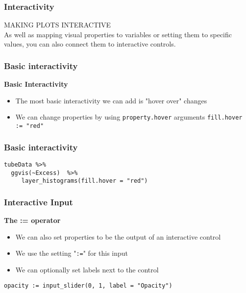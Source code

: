 \documentclass[MASTER.tex]{subfiles}
\begin{document}
 
	
\begin{frame}[fragile]
\frametitle{Interactivity}
{\LARGE MAKING PLOTS INTERACTIVE} \\ \bigskip
\large As well as mapping visual properties to variables or setting them to specific values, you can also connect them to interactive controls.

\end{frame}
\begin{frame}
\frametitle{Basic interactivity}
\large
\textbf{Basic Interactivity}
\begin{itemize}
\item The most basic interactivity we can add is "hover
over" changes
\item We can change properties by using
\texttt{property.hover} arguments
\texttt{fill.hover := "red"}
\end{itemize}
\end{frame}
\begin{frame}[fragile]
	\frametitle{Basic interactivity}
\begin{framed}
\begin{verbatim}
tubeData %>%
  ggvis(~Excess)  %>%
     layer_histograms(fill.hover = "red") 
\end{verbatim}
\end{framed}
\end{frame}
\begin{frame}[fragile]
\frametitle{Interactive Input}
\Large
\textbf{The := operator}
\begin{itemize}
	\item We can also set properties to be the output of an
	interactive control
	
	\item We use the setting "\texttt{:=}" for this input
	\item We can optionally set labels next to the control
\end{itemize}
\begin{framed}
\begin{verbatim}
opacity := input_slider(0, 1, label = "Opacity")
\end{verbatim}
\end{framed}
\end{frame}
\end{document}
